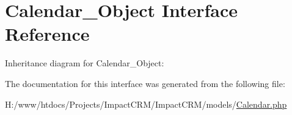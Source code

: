 \hypertarget{interfaceCalendar__Object}{
\section{Calendar\_\-Object Interface Reference}
\label{interfaceCalendar__Object}
}


Inheritance diagram for Calendar\_\-Object:


The documentation for this interface was generated from the following file:\begin{DoxyCompactItemize}
\item 
H:/www/htdocs/Projects/ImpactCRM/ImpactCRM/models/\hyperlink{Calendar_8php}{Calendar.php}\end{DoxyCompactItemize}
